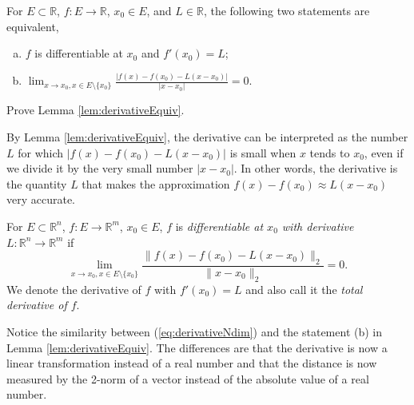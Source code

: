 \begin{lem}
  \label{lem:derivativeEquiv}
  For $E\subset \mathbb{R}$, $f: E\rightarrow \mathbb{R}$,
  $x_0\in E$, and $L\in \mathbb{R}$,
  the following two statements are equivalent,
  \begin{enumerate}[(a)]\itemsep0em
  \item $f$ is differentiable at $x_0$ and $f'(x_0)=L$;
  \item $\lim_{x\rightarrow x_0, x\in E\setminus\{x_0\}} \frac{|f(x)-
      f(x_0) - L(x-x_0)|}{|x-x_0|}=0$.
  \end{enumerate}
\end{lem}

\begin{exc}
  Prove Lemma \ref{lem:derivativeEquiv}.
\end{exc}

\begin{rem}
  By Lemma \ref{lem:derivativeEquiv},
  the derivative can be interpreted as the number $L$
  for which $|f(x)- f(x_0)-L(x-x_0)|$ is small when $x$ tends to $x_0$,
  even if we divide it by the very small number $|x-x_0|$.
  In other words, the derivative is the quantity $L$
  that makes the approximation $f(x)-f(x_0) \approx L(x-x_0)$
  very accurate.
\end{rem}

\begin{defn}
  \label{def:derivativeNdim}
  For $E\subset \mathbb{R}^n$, $f: E\rightarrow \mathbb{R}^m$,
  $x_0\in E$, $f$ is \emph{differentiable at $x_0$ with derivative}
  $L: \mathbb{R}^n \rightarrow \mathbb{R}^m$
  if
  \begin{equation}
    \label{eq:derivativeNdim}
    \lim_{x\rightarrow x_0, x\in E\setminus\{x_0\}} \frac{\|f(x)-
      f(x_0) - L(x-x_0)\|_2}{\|x-x_0\|_2}=0.
  \end{equation}
  We denote the derivative of $f$ with $f'(x_0)=L$
  and also call it the \emph{total derivative of $f$}.
\end{defn}

\begin{rem}
  Notice the similarity between (\ref{eq:derivativeNdim})
  and the statement (b) in Lemma \ref{lem:derivativeEquiv}.
  The differences are that the derivative is now a linear
  transformation instead of a real number
  and that the distance is now measured by the 2-norm of a vector
  instead of the absolute value of a real number.  
\end{rem}

